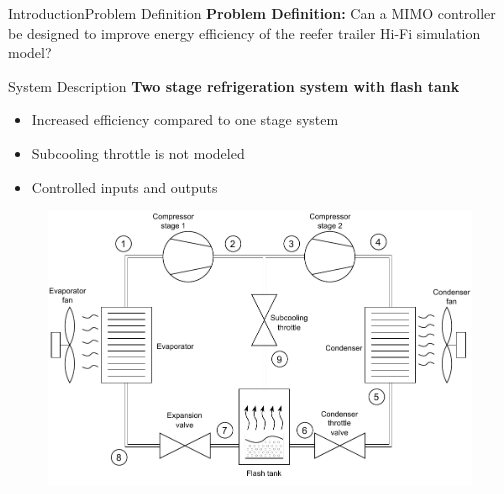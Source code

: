 \begin{frame}{Introduction}{Problem Definition}
	\textbf{Problem Definition:} Can a MIMO controller be designed to improve energy efficiency of the reefer trailer Hi-Fi simulation model?
\end{frame}

\begin{frame}{System Description}{}
	\textbf{Two stage refrigeration system with flash tank}
	\begin{itemize}
		\item Increased efficiency compared to one stage system 
		\item Subcooling throttle is not modeled
		\item Controlled inputs and outputs
	\end{itemize}
\begin{figure}[h]
	\centering
	\begin{minipage}{0.6\textwidth}
		\centering
		\includegraphics[width=1\textwidth]{../Graphics/HVAC_Diagram_Fans.pdf} %
	\end{minipage}\hfill
	\begin{minipage}{0.4\textwidth}
		\centering

\end{minipage}
\end{figure}
\end{frame}
